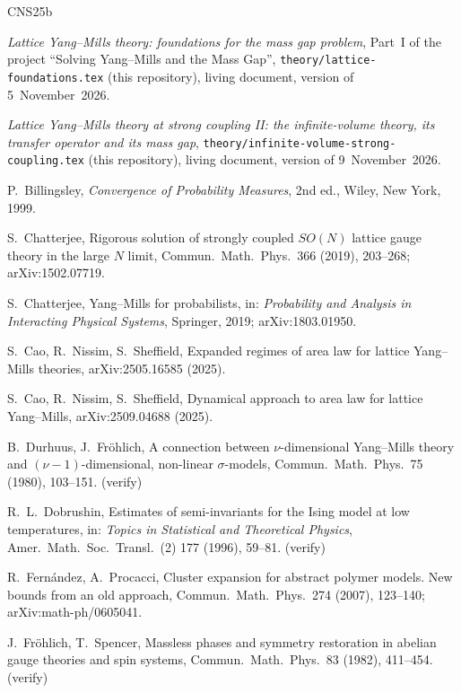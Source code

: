\documentclass[11pt,a4paper]{article}
\theoremstyle{definition}
\theoremstyle{remark}
\begin{document}
\begin{thebibliography}{CNS25b}

\emph{Lattice Yang--Mills theory: foundations for the mass gap problem}, Part~I of the project ``Solving Yang--Mills
and the Mass Gap'', \texttt{theory/lattice-foundations.tex} (this repository), living document, version of
5~November~2026.

\emph{Lattice Yang--Mills theory at strong coupling II: the infinite-volume theory, its transfer operator and its mass gap},
\texttt{theory/infinite-volume-strong-coupling.tex} (this repository), living document, version of 9~November~2026.

P.~Billingsley, \emph{Convergence of Probability Measures}, 2nd ed., Wiley, New York, 1999.

S.~Chatterjee, Rigorous solution of strongly coupled $SO(N)$ lattice gauge theory in the large $N$ limit,
Commun.\ Math.\ Phys.\ 366 (2019), 203--268; arXiv:1502.07719.

S.~Chatterjee, Yang--Mills for probabilists, in: \emph{Probability and Analysis in Interacting Physical Systems},
Springer, 2019; arXiv:1803.01950.

S.~Cao, R.~Nissim, S.~Sheffield, Expanded regimes of area law for lattice Yang--Mills theories,
arXiv:2505.16585 (2025).

S.~Cao, R.~Nissim, S.~Sheffield, Dynamical approach to area law for lattice Yang--Mills, arXiv:2509.04688 (2025).

B.~Durhuus, J.~Fröhlich, A connection between $\nu$-dimensional Yang--Mills theory and $(\nu-1)$-dimensional, non-linear
$\sigma$-models, Commun.\ Math.\ Phys.\ 75 (1980), 103--151. (verify)

R.~L.~Dobrushin, Estimates of semi-invariants for the Ising model at low temperatures, in: \emph{Topics in Statistical
and Theoretical Physics}, Amer.\ Math.\ Soc.\ Transl.\ (2) 177 (1996), 59--81. (verify)

R.~Fernández, A.~Procacci, Cluster expansion for abstract polymer models. New bounds from an old approach,
Commun.\ Math.\ Phys.\ 274 (2007), 123--140; arXiv:math-ph/0605041.

J.~Fröhlich, T.~Spencer, Massless phases and symmetry restoration in abelian gauge theories and spin systems,
Commun.\ Math.\ Phys.\ 83 (1982), 411--454. (verify)


\end{thebibliography}
\end{document}
